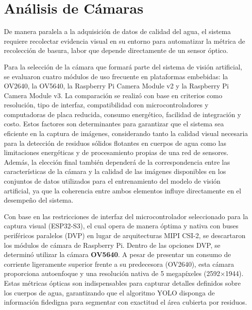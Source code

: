 \section{Análisis de Cámaras}
\label{sec:analisis_de_camaras}
De manera paralela a la adquisición de datos de calidad del agua, el sistema requiere recolectar evidencia visual en su entorno para automatizar la métrica de recolección de basura, labor que depende directamente de un sensor óptico.

Para la selección de la cámara que formará parte del sistema de visión artificial, se evaluaron cuatro módulos de uso frecuente en plataformas embebidas: la OV2640, la OV5640, la Raspberry Pi Camera Module v2 y la Raspberry Pi Camera Module v3. La comparación se realizó con base en criterios como resolución, tipo de interfaz, compatibilidad con microcontroladores y computadoras de placa reducida, consumo energético, facilidad de integración y costo. Estos factores son determinantes para garantizar que el sistema sea eficiente en la captura de imágenes, considerando tanto la calidad visual necesaria para la detección de residuos sólidos flotantes en cuerpos de agua como las limitaciones energéticas y de procesamiento propias de una red de sensores. Además, la elección final también dependerá de la correspondencia entre las características de la cámara y la calidad de las imágenes disponibles en los conjuntos de datos utilizados para el entrenamiento del modelo de visión artificial, ya que la coherencia entre ambos elementos influye directamente en el desempeño del sistema.



Con base en las restricciones de interfaz del microcontrolador seleccionado para la captura visual (ESP32-S3), el cual opera de manera óptima y nativa con buses periféricos paralelos (DVP) en lugar de arquitecturas MIPI CSI-2, se descartaron los módulos de cámara de Raspberry Pi. Dentro de las opciones DVP, se determinó utilizar la cámara \textbf{OV5640}. A pesar de presentar un consumo de corriente ligeramente superior frente a su predecesora (OV2640), esta cámara proporciona autoenfoque y una resolución nativa de 5 megapíxeles (2592$\times$1944). Estas métricas ópticas son indispensables para capturar detalles definidos sobre los cuerpos de agua, garantizando que el algoritmo YOLO disponga de información fidedigna para segmentar con exactitud el área cubierta por residuos.

